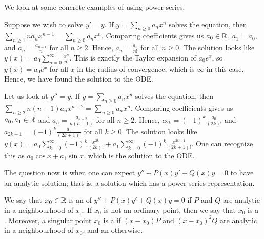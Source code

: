 We look at some concrete examples of using power series.
\begin{example}
    Suppose we wish to solve $y' = y$. If $y = \sum_{n \geq 0} a_{n} x^{n}$ solves the equation, then $\sum_{n \geq 1} n a_{n} x^{n-1} = \sum_{n \geq 0} a_{n} x^{n}$. Comparing coefficients gives us $a_{0} \in \mathbb{R}$, $a_{1} = a_{0}$, and $a_{n} = \frac{a_{n-1}}{n}$ for all $n \geq 2$. Hence, $a_{n} = \frac{a_{0}}{n!}$ for all $n \geq 0$. The solution looks like $y(x) = a_{0} \sum_{n=0}^{\infty} \frac{x^{n}}{n!}$. This is exactly the Taylor expansion of $a_{0} e^{x}$, so $y(x) = a_{0} e^{x}$ for all $x$ in the radius of convergence, which is $\infty$ in this case. Hence, we have found the solution to the ODE.
\end{example}

\begin{example}
    Let us look at $y'' = y$. If $y = \sum_{n \geq 0} a_{n} x^{n}$ solves the equation, then $\sum_{n \geq 2} n(n-1) a_{n} x^{n-2} = \sum_{n \geq 0} a_{n} x^{n}$. Comparing coefficients gives us $a_{0}, a_{1} \in \mathbb{R}$ and $a_{n} = \frac{a_{n-2}}{n(n-1)}$ for all $n \geq 2$. Hence, $a_{2k} = (-1)^{k}\frac{a_{0}}{(2k)!}$ and $a_{2k+1} = (-1)^{k}\frac{a_{1}}{(2k+1)!}$ for all $k \geq 0$. The solution looks like $y(x) = a_{0} \sum_{k=0}^{\infty} (-1)^{k}\frac{x^{2k}}{(2k)!} + a_{1} \sum_{k=0}^{\infty} (-1)^{k}\frac{x^{2k+1}}{(2k+1)!}$. One can recognize this as $a_{0} \cos x + a_{1} \sin x$, which is the solution to the ODE.
\end{example}

The question now is when one can expect $y'' + P(x) y' + Q(x) y = 0$ to have an analytic solution; that is, a solution which has a power series representation.

\begin{definition}
    We say that $x_{0} \in \mathbb{R}$ is an  of $y'' + P(x) y' + Q(x) y = 0$ if $P$ and $Q$ are analytic in a neighbourhood of $x_{0}$. If $x_{0}$ is not an ordinary point, then we say that $x_{0}$ is a . Moreover, a singular point $x_{0}$ is a  if $(x-x_{0})P$ and $(x-x_{0})^{2} Q$ are analytic in a neighbourhood of $x_{0}$, and an  otherwise.
\end{definition}

